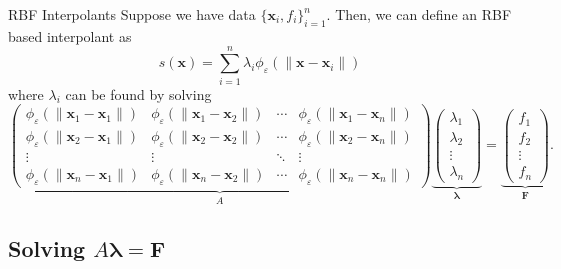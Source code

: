\documentclass{cubeamer}
\newcommand{\eps}{\varepsilon}
\newcommand{\norm}[1]{\lVert #1 \rVert}
\newcommand{\pmat}[1]{\begin{pmatrix} #1 \end{pmatrix}}
\begin{document}
\begin{frame}{RBF Interpolants}
    Suppose we have data $ \{\mathbf{x}_i, f_i\}_{i = 1}^n $. \pause Then, we can define an RBF based interpolant as
    \[
    	s(\mathbf{x}) = \sum_{i = 1}^n \lambda_i \phi_\eps(\norm{\mathbf{x} - \mathbf{x}_i})
    \] \pause
    where $ \lambda_i $ can be found by solving
    \[
    	\underbrace{\pmat{
    			\phi_\eps (\norm{\mathbf{x}_1 - \mathbf{x}_1}) & \phi_\eps (\norm{\mathbf{x}_1 - \mathbf{x}_2}) & \cdots & \phi_\eps (\norm{\mathbf{x}_1 - \mathbf{x}_n}) \\
    			\phi_\eps (\norm{\mathbf{x}_2 - \mathbf{x}_1}) & \phi_\eps (\norm{\mathbf{x}_2 - \mathbf{x}_2}) & \cdots & \phi_\eps (\norm{\mathbf{x}_2 - \mathbf{x}_n}) \\
    			\vdots & \vdots & \ddots & \vdots \\ 
    			\phi_\eps (\norm{\mathbf{x}_n - \mathbf{x}_1}) & \phi_\eps (\norm{\mathbf{x}_n - \mathbf{x}_2}) & \cdots & \phi_\eps (\norm{\mathbf{x}_n - \mathbf{x}_n})
    	}}_{A} \underbrace{\pmat{
    			\lambda_1 \\ \lambda_2 \\ \vdots \\ \lambda_n
    	}}_{\pmb{\lambda}} = \underbrace{\pmat{
    			f_1 \\ f_2 \\ \vdots \\ f_n
    	}}_{\pmb{F}}.
    \]
\end{frame}

\subsection{Solving $ A \pmb{\lambda} = \pmb{F} $}
\end{document}
